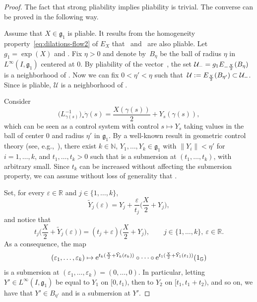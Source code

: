 \documentclass[10pt,a4paper]{amsart}
\numberwithin{equation}{section}
\theoremstyle{definition}
\begin{document}
\begin{proof}
 The fact that strong pliability implies pliability is trivial. The converse can be proved in the following way.

Assume that $X\in{\mathfrak g}_1$ is pliable. It results from the homogeneity property~\eqref{eq:dilations-flow2} of $E_X$ that~ and~ are also pliable. Let $g_1=\exp(X)$ and .
Fix $\eta>0$ and denote by~$B_\eta$ be the ball of radius $\eta$ in $L^\infty(I,{\mathfrak g}_1)$ centered at $0$.
By pliability of the vector~, the set
${\mathcal U_-=g_1 \smash{E_{-\frac X2}(B_\eta)}}$ is a neighborhood of .
 Now we can fix $0<\eta'<\eta$ such that~$\mathcal U:=\smash{E_{\frac X2}(B_{\eta'})\subset
 \mathcal U_-}$. Since  is pliable, $\mathcal U$ is a neighborhood of .

 Consider
 \begin{equation*}%
 \bigl(L_{\gamma(s)}^{-1}\bigr)_*\dot\gamma(s)=\frac{X(\gamma(s))}{2}+Y_s(\gamma(s)),
\end{equation*}
 which can be seen as a control system
 with control $s\mapsto Y_s$ taking values in the ball of center $0$ and radius $\eta'$ in ${\mathfrak g}_1$.
 By a well-known result in geometric control theory (see, e.g.,~\cite[Section~3, Theorem~1]{Jurdjevic}),
 there exist $k\in \mathbb{N}$, $Y_1,\dots,Y_k\in {\mathfrak g}_1$ with $\|Y_i\|<\eta'$ for $i=1,\dots,k$, and ${t_1,\dots,t_k>0}$ such that
  is a submersion at $(t_1,\dots,t_k)$, with  arbitrary small. Since $t_k$ can be
 increased without affecting
 the submersion property, we can assume without loss of generality that .

Set, for every $\varepsilon\in \mathbb{R}$ and $j\in\{1,\dots,k\}$,
\[\tilde Y_j(\varepsilon)=Y_j + \frac{\varepsilon}{t_j}\biggl( \frac X2+Y_j\biggr),\]
and notice that
\[t_j\biggl(\frac X2+\tilde Y_j(\varepsilon)\biggr)=(t_j+\varepsilon)\biggl(\frac X2+Y_j\biggr),\qquad j\in\{1,\dots,k\},\ \varepsilon\in \mathbb{R}.\]
As a consequence, the map
\[(\varepsilon_1,\dots,\varepsilon_k)\mapsto {\rm e}^{t_k(\frac X2+\tilde Y_k(\varepsilon_{k}))}\circ \dots \circ {\rm e}^{t_1(\frac X2+\tilde Y_1(\varepsilon_1))}(1_{\mathbb{G}})\]
is a submersion at $(\varepsilon_1,\dots,\varepsilon_k)=(0,\dots,0)$.
In particular, letting $Y'\in L^\infty(I,{\mathfrak g}_1)$
be equal to $Y_1$ on $[0,t_1)$, then to $Y_2$ on $[t_1,t_1+t_2)$, and so on, we have that $Y'\in B_{\eta'}$ and
 is a submersion at $Y'$.


\end{proof}
\end{document}
